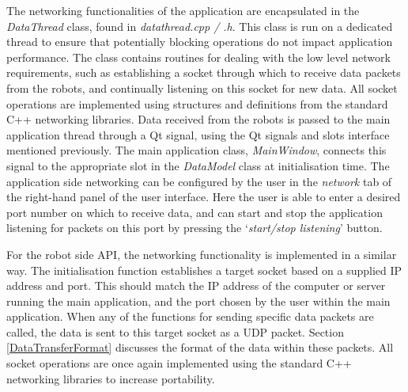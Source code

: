 The networking functionalities of the application are encapsulated in the \textit{DataThread} class, found in \textit{datathread.cpp / .h}. This class is run on a dedicated thread to ensure that potentially blocking operations do not impact application performance. The class contains routines for dealing with the low level network requirements, such as establishing a socket through which to receive data packets from the robots, and continually listening on this socket for new data. All socket operations are implemented using structures and definitions from the standard C++ networking libraries. Data received from the robots is passed to the main application thread through a Qt signal, using the Qt signals and slots interface mentioned previously. The main application class, \textit{MainWindow}, connects this signal to the appropriate slot in the \textit{DataModel} class at initialisation time. The application side networking can be configured by the user in the \textit{network} tab of the right-hand panel of the user interface. Here the user is able to enter a desired port number on which to receive data, and can start and stop the application listening for packets on this port by pressing the `\textit{start/stop listening}' button.

For the robot side API, the networking functionality is implemented in a similar way. The initialisation function establishes a target socket based on a supplied IP address and port. This should match the IP address of the computer or server running the main application, and the port chosen by the user within the main application. When any of the functions for sending specific data packets are called, the data is sent to this target socket as a UDP packet. Section \ref{DataTransferFormat} discusses the format of the data within these packets. All socket operations are once again implemented using the standard C++ networking libraries to increase portability.


